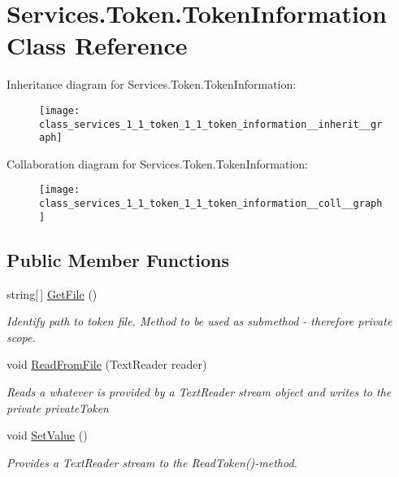 \hypertarget{class_services_1_1_token_1_1_token_information}{}\section{Services.\+Token.\+Token\+Information Class Reference}
\label{class_services_1_1_token_1_1_token_information}


Inheritance diagram for Services.\+Token.\+Token\+Information\+:
\nopagebreak
\begin{figure}[H]
\begin{center}
\leavevmode
\texttt{[image: class\_services\_1\_1\_token\_1\_1\_token\_information\_\_inherit\_\_graph]}
\end{center}
\end{figure}


Collaboration diagram for Services.\+Token.\+Token\+Information\+:
\nopagebreak
\begin{figure}[H]
\begin{center}
\leavevmode
\texttt{[image: class\_services\_1\_1\_token\_1\_1\_token\_information\_\_coll\_\_graph]}
\end{center}
\end{figure}
\subsection*{Public Member Functions}
\begin{DoxyCompactItemize}
\item 
string\mbox{[}$\,$\mbox{]} \hyperlink{class_services_1_1_token_1_1_token_information_a37295436ba6b0c749486fcb647fcd904}{Get\+File} ()
\begin{DoxyCompactList}\small\item\em Identify path to token file. Method to be used as submethod -\/ therefore private scope. \end{DoxyCompactList}\item 
void \hyperlink{class_services_1_1_token_1_1_token_information_ac080b926c4adadd033ebad6cea64baf4}{Read\+From\+File} (Text\+Reader reader)
\begin{DoxyCompactList}\small\item\em Reads a whatever is provided by a Text\+Reader stream object and writes to the private private\+Token \end{DoxyCompactList}\item 
void \hyperlink{class_services_1_1_token_1_1_token_information_a2cdb068d0ace07409c398e3c40c5b84d}{Set\+Value} ()
\begin{DoxyCompactList}\small\item\em Provides a Text\+Reader stream to the Read\+Token()-\/method. \end{DoxyCompactList}\end{DoxyCompactItemize}

